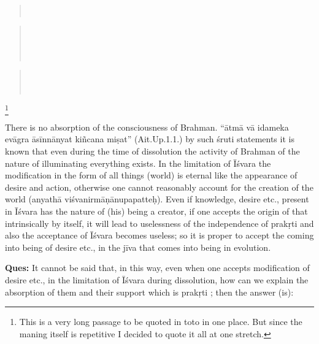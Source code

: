 \begin{verse}
\\
\end{verse}
\begin{verse}
\\
\\
\\
\end{verse}
\begin{verse}
\\
\\
\end{verse}
\footnote{This is a very long passage to be quoted in toto in one place. But since the maning itself is repetitive I decided to quote it all at one stretch.}

There is no absorption of the consciousness of Brahman. “ātmā vā idameka evāgra āsīnnānyat kiñcana miṣat” (Ait.Up.1.1.) by such śruti statements it is known that even during the time of dissolution the activity of Brahman of the nature of illuminating everything exists. In the limitation of Īśvara the modification in the form of all things (world) is eternal like the appearance of desire and action, otherwise one cannot reasonably account for the creation of the world (anyathā viśvanirmāṇānupapatteḥ). Even if knowledge, desire etc., present in Īśvara has the nature of (his) being a creator, if one accepts the origin of that intrinsically by itself, it will lead to uselessness of the independence of prakṛti and also the acceptance of Īśvara becomes useless; so it is proper to accept the coming into being of desire etc., in the jīva that comes into being in evolution.

\textbf{Ques:} It cannot be said that, in this way, even when one accepts modification of desire etc., in the limitation of Īśvara during dissolution, how can we explain the absorption of them and their support which is prakṛti ; then the answer  (is): 

